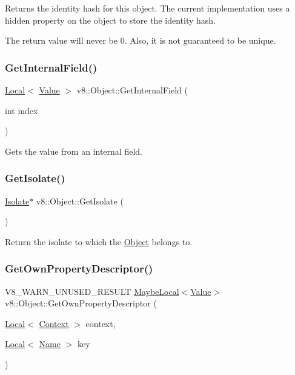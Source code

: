 Returns the identity hash for this object. The current implementation uses a hidden property on the object to store the identity hash.

The return value will never be 0. Also, it is not guaranteed to be unique. \mbox{\label{classv8_1_1Object_aa3324fdf652d8ac3b2f27faa0559231d}} 
\subsubsection{\texorpdfstring{Get\+Internal\+Field()}{GetInternalField()}}
{\footnotesize\ttfamily \mbox{\hyperlink{classv8_1_1Local}{Local}}$<$ \mbox{\hyperlink{classv8_1_1Value}{Value}} $>$ v8\+::\+Object\+::\+Get\+Internal\+Field (\begin{DoxyParamCaption}\item[{int}]{index }\end{DoxyParamCaption})}

Gets the value from an internal field. \mbox{\label{classv8_1_1Object_ab991b53d50ab3ce53179e927e52b24f5}} 
\subsubsection{\texorpdfstring{Get\+Isolate()}{GetIsolate()}}
{\footnotesize\ttfamily \mbox{\hyperlink{classv8_1_1Isolate}{Isolate}}$\ast$ v8\+::\+Object\+::\+Get\+Isolate (\begin{DoxyParamCaption}{ }\end{DoxyParamCaption})}

Return the isolate to which the \mbox{\hyperlink{classv8_1_1Object}{Object}} belongs to. \mbox{\label{classv8_1_1Object_a96c87fe175a5f66b156bb9fa472e480d}} 
\subsubsection{\texorpdfstring{Get\+Own\+Property\+Descriptor()}{GetOwnPropertyDescriptor()}}
{\footnotesize\ttfamily V8\+\_\+\+W\+A\+R\+N\+\_\+\+U\+N\+U\+S\+E\+D\+\_\+\+R\+E\+S\+U\+LT \mbox{\hyperlink{classv8_1_1MaybeLocal}{Maybe\+Local}}$<$\mbox{\hyperlink{classv8_1_1Value}{Value}}$>$ v8\+::\+Object\+::\+Get\+Own\+Property\+Descriptor (\begin{DoxyParamCaption}\item[{\mbox{\hyperlink{classv8_1_1Local}{Local}}$<$ \mbox{\hyperlink{classv8_1_1Context}{Context}} $>$}]{context,  }\item[{\mbox{\hyperlink{classv8_1_1Local}{Local}}$<$ \mbox{\hyperlink{classv8_1_1Name}{Name}} $>$}]{key }\end{DoxyParamCaption})}

